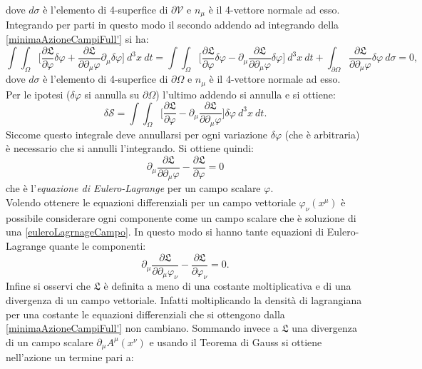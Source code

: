 dove $d\sigma$ è l'elemento di 4-superfice di $\partial\mathcal{V}$ e $n_\mu$ è il 4-vettore normale ad esso.\\
Integrando per parti in questo modo il secondo addendo ad integrando della \eqref{minimaAzioneCampiFull'} si ha:
\begin{equation*}
    \int\int_{\Omega}\bigg[\frac{\partial\mathfrak{L}}{\partial \varphi}\delta\varphi+\frac{\partial\mathfrak{L}}{\partial \partial_\mu\varphi}\partial_\mu\delta\varphi\bigg]\ d^3x\ dt=\int\int_{\Omega}\bigg[\frac{\partial\mathfrak{L}}{\partial \varphi}\delta\varphi-\partial_\mu\frac{\partial\mathfrak{L}}{\partial \partial_\mu\varphi}\delta\varphi\bigg]\ d^3x\ dt+\int_{\partial\Omega }\frac{\partial\mathfrak{L}}{\partial \partial_\mu\varphi}\delta\varphi\ d\sigma=0,
\end{equation*}
dove $d\sigma$ è l'elemento di 4-superfice di $\partial\Omega$ e $n_\mu$ è il 4-vettore normale ad esso.\\
Per le ipotesi ($\delta\varphi$ si annulla su $\partial\Omega$) l'ultimo addendo si annulla e si ottiene:
\begin{equation*}
    \delta\mathcal{S}=\int\int_{\Omega}\bigg[\frac{\partial\mathfrak{L}}{\partial \varphi}-\partial_\mu\frac{\partial\mathfrak{L}}{\partial \partial_\mu\varphi}\bigg]\delta\varphi\ d^3x\ dt.
\end{equation*}
Siccome questo integrale deve annullarsi per ogni variazione $\delta\varphi$ (che è arbitraria) è necessario che si annulli l'integrando. Si ottiene quindi:
\begin{equation}
    \partial_\mu\frac{\partial\mathfrak{L}}{\partial \partial_\mu\varphi}-\frac{\partial\mathfrak{L}}{\partial \varphi}=0\label{euleroLagrnageCampo}
\end{equation}
che è l'\emph{equazione di Eulero-Lagrange} per un campo scalare $\varphi$.\\Volendo ottenere le equazioni differenziali per un campo vettoriale $\varphi_\nu(x^\mu)$ è possibile considerare ogni componente come un campo scalare che è soluzione di una \eqref{euleroLagrnageCampo}. In questo modo si hanno tante equazioni di Eulero-Lagrange quante le componenti:
\begin{equation}
    \partial_\mu\frac{\partial\mathfrak{L}}{\partial \partial_\mu\varphi_\nu}-\frac{\partial\mathfrak{L}}{\partial \varphi_\nu}=0\label{euleroLagrnageCampi}.
\end{equation}
Infine si osservi che $\mathfrak{L}$ è definita a meno di una costante moltiplicativa e di una divergenza di un campo vettoriale. Infatti moltiplicando la densità di lagrangiana per una costante le equazioni differenziali che si ottengono dalla \eqref{minimaAzioneCampiFull'} non cambiano. Sommando invece a $\mathfrak{L}$ una divergenza di un campo scalare $\partial_\mu A^\mu(x^\nu)$ e usando il Teorema di Gauss si ottiene nell'azione un termine pari a:
